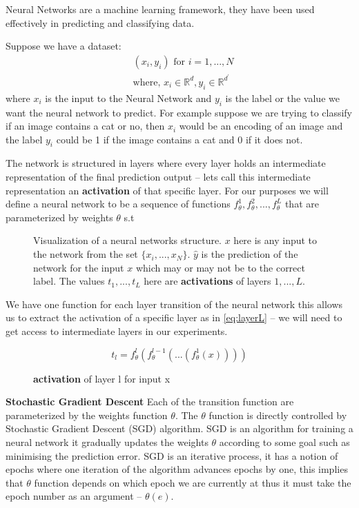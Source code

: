 \documentclass[dissertation.tex]{subfiles}
\begin{document}
Neural Networks are a machine learning framework, they have been used
effectively in predicting and classifying data.

Suppose we have a dataset:
\begin{align*}
  &(x_i, y_i) \text{ for } i = 1,...,N \\
  &\text{where, } x_i \in \mathbb{R}^d, y_i \in \mathbb{R}^{d^\prime}
\end{align*}
where $x_i$ is the input to the Neural Network and $y_i$ is the label or the
value we want the neural network to predict. For example suppose we are trying
to classify if an image contains a cat or no, then $x_i$ would be an encoding of
an image and the label $y_i$ could be 1 if the image contains a cat and 0 if it
does not.

The network is structured in layers where every layer holds an intermediate
representation of the final prediction output -- lets call this intermediate
representation an \textbf{activation} of that specific layer. For our purposes
we will define a neural network to be a sequence of functions
$f_{\theta}^1,f_{\theta}^2,...,f_{\theta}^L$ that are parameterized by weights
$\theta$ s.t


\vspace*{-\baselineskip}
\vspace*{-\baselineskip}
\begin{figure}[H]
  \centering
  \caption{
    Visualization of a neural networks structure.  $x$ here is any input to the
    network from the set $\{x_i,...,x_N\}$.  $\hat{y}$ is the prediction of the
    network for the input $x$ which may or may not be to the correct label. The
    values $t_1,...,t_L$ here are \textbf{activations} of layers $1,...,L$.
  }
  \label{fig:network}
\end{figure}

We have one function for each layer transition of the neural network this allows
us to extract the activation of a specific layer as in \autoref{eq:layerL} -- we
will need to get access to intermediate layers in our experiments.

\begin{figure}[H]
  \[ t_l = f_{\theta}^l(f_{\theta}^{l-1}(...(f_{\theta}^1(x)))) \]
  \caption{\textbf{activation} of layer l for input x}
  \label{eq:layerL}
\end{figure}

\textbf{Stochastic Gradient Descent} Each of the transition function are
parameterized by the weights function $\theta$. The $\theta$ function is
directly controlled by Stochastic Gradient Descent (SGD) algorithm.  SGD is an
algorithm for training a neural network it gradually updates the weights
$\theta$ according to some goal such as minimising the prediction error.  SGD is
an iterative process, it has a notion of epochs where one iteration of the
algorithm advances epochs by one, this implies that $\theta$ function depends on
which epoch we are currently at thus it must take the epoch number as an
argument -- $\theta(e)$.
\end{document}
